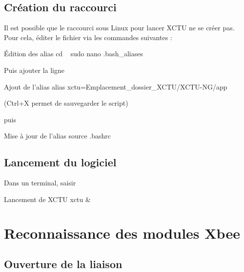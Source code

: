 \subsection{Création du raccourci}

Il est possible que le raccourci sous Linux pour lancer XCTU ne se créer pas. Pour cela, éditer le fichier  via les commandes suivantes : 

\begin{Bash}{Édition des alias}
cd ~
sudo nano .bash_aliases
\end{Bash}

Puis ajouter la ligne 
\begin{Bash}{Ajout de l'alias}
alias xctu=Emplacement_dossier_XCTU/XCTU-NG/app
\end{Bash}
(Ctrl+X permet de sauvegarder le script)

puis 
\begin{Bash}{Mise à jour de l'alias}
source .bashrc
\end{Bash}

\subsection{Lancement du logiciel}

Dans un terminal, saisir
\begin{Bash}{Lancement de XCTU}
xctu &
\end{Bash}


\section{Reconnaissance des modules Xbee}

\subsection{Ouverture de la liaison}

